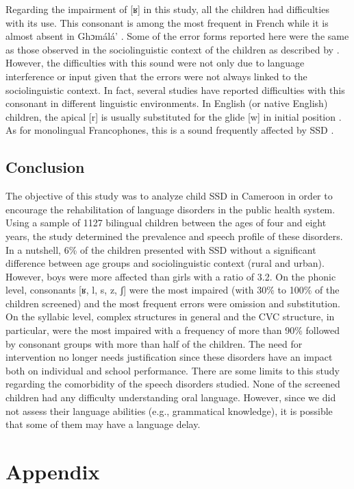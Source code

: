 \documentclass[output=paper,newtxmath,modfonts,nonflat,draftmode]{langsci/langscibook}
\begin{document}
Regarding the impairment of [ʁ] in this study, all the children had difficulties with its use. This consonant is among the most frequent in French \citep{Peytard1970} while it is almost absent in Ghɔmálá’ \citep{Mba1995}. Some of the error forms reported here were the same as those observed in the sociolinguistic context of the children as described by \citet{Biloa2004}. However, the difficulties with this sound were not only due to language interference or input given that the errors were not always linked to the sociolinguistic context. In fact, several studies have reported difficulties with this consonant in different linguistic environments. In English (or native English) children, the apical [r] is usually substituted for the glide [w] in initial position \citep{Bowen2014}. As for monolingual Francophones, this is a sound frequently affected by SSD \cite{Maurin-Cherou1993}.

\subsection{Conclusion} %

The objective of this study was to analyze child SSD in Cameroon in order to encourage the rehabilitation of language disorders in the public health system. Using a sample of 1127 bilingual children between the ages of four and eight years, the study determined the prevalence and speech profile of these disorders. In a nutshell, 6\% of the children presented with SSD without a significant difference between age groups and sociolinguistic context (rural and urban). However, boys were more affected than girls with a ratio of 3.2. On the phonic level, consonants [ʁ, l, s, z, ʃ] were the most impaired (with 30\% to 100\% of the children screened) and the most frequent errors were omission and substitution. On the syllabic level, complex structures in general and the CVC structure, in particular, were the most impaired with a frequency of more than 90\% followed by consonant groups with more than half of the children. The need for intervention no longer needs justification since these disorders have an impact both on individual and school performance. There are some limits to this study regarding the comorbidity of the speech disorders studied. None of the screened children had any difficulty understanding oral language. However, since we did not assess their language abilities (e.g., grammatical knowledge), it is possible that some of them may have a language delay.
 
\section*{Appendix}
\end{document}
